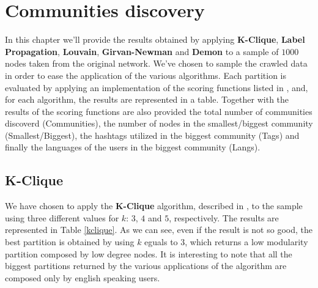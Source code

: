 \chapter{Communities discovery} %
\label{cha:communities_discovery}

In this chapter we'll provide the results obtained by applying \textbf{K-Clique}, \textbf{Label Propagation},
\textbf{Louvain}, \textbf{Girvan-Newman} and \textbf{Demon} to a sample of $1000$ nodes taken from the original
network. We've chosen to sample the crawled data in order to ease the application of the various algorithms.
Each partition is evaluated by applying an implementation of the scoring functions listed in
\cite{comm_ground_truth}, and, for each algorithm, the results are represented in a table. Together with the
results of the scoring functions are also provided the total number of communities discoverd (Communities), the
number of nodes in the smallest/biggest community (Smallest/Biggest), the hashtags utilized in the biggest
community (Tags) and finally the languages of the users in the biggest community (Langs).

\section{K-Clique} %
\label{sec:k_clique}
    We have chosen to apply the \textbf{K-Clique} algorithm, described in \cite{k_clique}, to the sample using
    three different values for $k$: $3$, $4$ and $5$, respectively. The results are represented in Table
    \ref{kclique}. As we can see, even if the result is not so good, the best partition is obtained by using $k$
    eguals to $3$, which returns a low modularity partition composed by low degree nodes. It is interesting to
    note that all the biggest partitions returned by the various applications of the algorithm are composed only
    by english speaking users.

